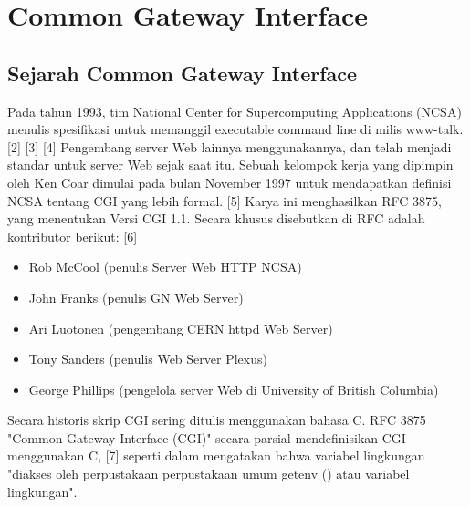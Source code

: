 \section{Common Gateway Interface}
\subsection{Sejarah Common Gateway Interface}
Pada tahun 1993, tim National Center for Supercomputing Applications (NCSA) menulis spesifikasi untuk memanggil executable command line di milis www-talk. [2] [3] [4] Pengembang server Web lainnya menggunakannya, dan telah menjadi standar untuk server Web sejak saat itu. Sebuah kelompok kerja yang dipimpin oleh Ken Coar dimulai pada bulan November 1997 untuk mendapatkan definisi NCSA tentang CGI yang lebih formal. [5] Karya ini menghasilkan RFC 3875, yang menentukan Versi CGI 1.1. Secara khusus disebutkan di RFC adalah kontributor berikut: [6]
\begin{itemize}
\item Rob McCool (penulis Server Web HTTP NCSA)
\item John Franks (penulis GN Web Server)
\item Ari Luotonen (pengembang CERN httpd Web Server)
\item Tony Sanders (penulis Web Server Plexus)
\item George Phillips (pengelola server Web di University of British Columbia)
\end{itemize}
Secara historis skrip CGI sering ditulis menggunakan bahasa C. RFC 3875 "Common Gateway Interface (CGI)" secara parsial mendefinisikan CGI menggunakan C, [7] seperti dalam mengatakan bahwa variabel lingkungan "diakses oleh perpustakaan perpustakaan umum getenv () atau variabel lingkungan". \cite{mccool1993common}
